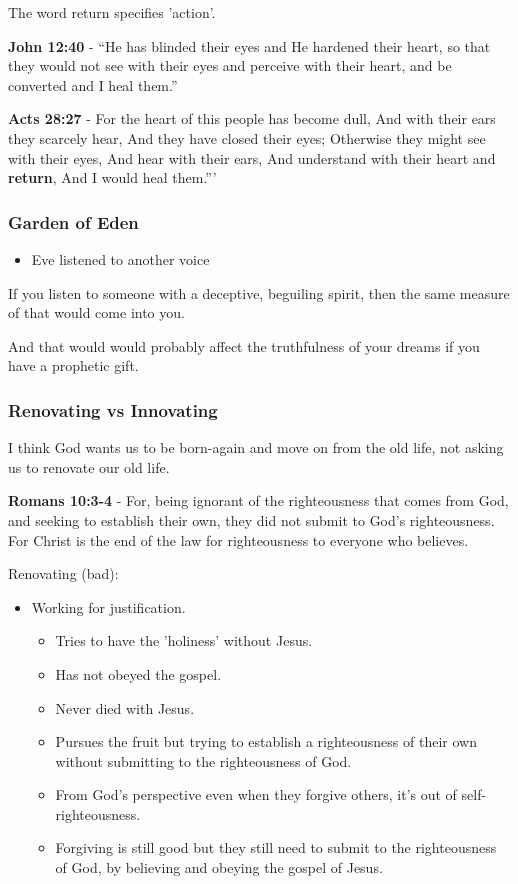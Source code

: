 \documentclass[11pt]{article}
\begin{document}
The word return specifies 'action'.

\textbf{John 12:40} - “He has blinded their eyes and He hardened their heart, so that they would not see with their eyes and perceive with their heart, and be converted and I heal them.”

\textbf{Acts 28:27} - For the heart of this people has become dull, And with their ears they scarcely hear, And they have closed their eyes; Otherwise they might see with their eyes, And hear with their ears, And understand with their heart and \textbf{return}, And I would heal them.”’

\subsubsection{Garden of Eden}
\label{sec:orga4c8d91}
\begin{itemize}
\item Eve listened to another voice
\end{itemize}

If you listen to someone with a deceptive, beguiling spirit, then the same measure of that would come into you.

And that would would probably affect the truthfulness of your dreams if you have a prophetic gift.

\subsubsection{Renovating vs Innovating}
\label{sec:org782f167}
I think God wants us to be born-again and move on from the old life,
not asking us to renovate our old life.

\textbf{Romans 10:3-4} - For, being ignorant of the righteousness that comes from God, and seeking to establish their own, they did not submit to God's righteousness. For Christ is the end of the law for righteousness to everyone who believes.

Renovating (bad):
\begin{itemize}
\item Working for justification.
\begin{itemize}
\item Tries to have the 'holiness' without Jesus.
\item Has not obeyed the gospel.
\item Never died with Jesus.
\item Pursues the fruit but trying to establish a righteousness of their own without submitting to the righteousness of God.
\item From God's perspective even when they forgive others, it's out of self-righteousness.
\item Forgiving is still good but they still need to submit to the righteousness of God, by believing and obeying the gospel of Jesus.
\end{itemize}
\end{itemize}
\end{document}

